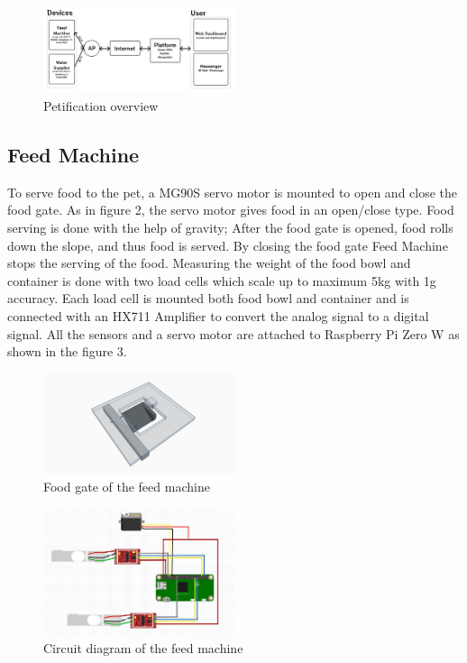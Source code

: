 \documentclass[conference]{IEEEtran}
\begin{document}
\begin{figure}[htbp]
\centerline{\includegraphics[width=0.5\textwidth]{./images/Overview.png}}
\caption{Petification overview}
\label{fig}
\end{figure}

\subsection{Feed Machine}
To serve food to the pet, a MG90S servo motor is mounted to open and close the food gate. As in figure 2, the servo motor gives food in an open/close type. Food serving is done with the help of gravity; After the food gate is opened, food rolls down the slope, and thus food is served. By closing the food gate Feed Machine stops the serving of the food. Measuring the weight of the food bowl and container is done with two load cells which scale up to maximum 5kg with 1g accuracy. Each load cell is mounted both food bowl and container and is connected with an HX711 Amplifier to convert the analog signal to a digital signal. All the sensors and a servo motor are attached to Raspberry Pi Zero W as shown in the figure 3.

\begin{figure}[htbp]
\centerline{\includegraphics[width=0.5\textwidth]{./images/servo_gate.png}}
\caption{Food gate of the feed machine}
\label{fig}
\end{figure}

\begin{figure}[htbp]
\centerline{\includegraphics[width=0.5\textwidth]{./images/feed machine circuit.jpg}}
\caption{Circuit diagram of the feed machine}
\label{fig}
\end{figure}
\end{document}
